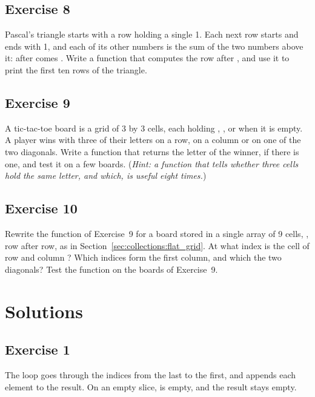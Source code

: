 \subsection*{Exercise 8}

Pascal's triangle starts with a row holding a single 1. Each next row starts and
ends with 1, and each of its other numbers is the sum of the two numbers above
it: after \token{[1, 3, 3, 1]} comes \token{[1, 4, 6, 4, 1]}. Write a function
 that computes the row after , and
use it to print the first ten rows of the triangle.

\subsection*{Exercise 9}

A tic-tac-toe board is a grid of 3 by 3 cells, each holding ,
, or  when it is empty. A player wins with three of their
letters on a row, on a column or on one of the two diagonals. Write a function
 that returns the letter of the
winner, if there is one, and test it on a few boards. (\textit{Hint: a function
that tells whether three cells hold the same letter, and which, is useful eight
times.})

\subsection*{Exercise 10}

Rewrite the function  of Exercise~9 for a board stored in a single
array of 9 cells, \token{[c8 ; 9]}, row after row, as in
Section~\ref{sec:collections:flat_grid}. At what index is the cell of row
 and column ? Which indices form the first column, and which
the two diagonals? Test the function on the boards of Exercise~9.

\vfill%
\pagebreak

\forceevenpage{}

\section*{Solutions}
%
\subsection*{Exercise 1}

The loop goes through the indices from the last to the first, and appends each
element to the result. On an empty slice,  is empty, and the
result stays empty.

